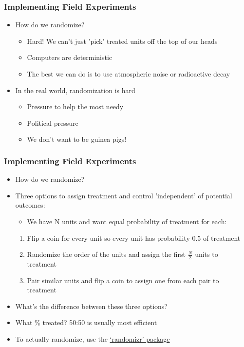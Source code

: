 \documentclass[xcolor=x11names,compress]{beamer}\usepackage[]{graphicx}\usepackage[]{color}
\renewcommand{\(}{\begin{columns}}
\renewcommand{\)}{\end{columns}}
\newcommand{\<}[1]{\begin{column}{#1}}
\renewcommand{\>}{\end{column}}
\begin{document}
\begin{frame}
\frametitle{Implementing Field Experiments}
\begin{itemize}
\item How do we randomize?
\begin{itemize}
\item Hard! We can't just 'pick' treated units off the top of our heads
\pause
\item Computers are deterministic
\pause
\item The best we can do is to use atmospheric noise or radioactive decay
\pause
\end{itemize}
\item In the real world, randomization is hard
\begin{itemize}
\item Pressure to help the most needy
\pause
\item Political pressure
\pause
\item We don't want to be guinea pigs!
\end{itemize}
\end{itemize}
\end{frame}


\begin{frame}
\frametitle{Implementing Field Experiments}
\begin{itemize}
\item How do we randomize?
\pause
\item Three options to assign treatment and control 'independent' of potential outcomes:
\pause
\begin{itemize}
\item We have N units and want equal probability of treatment for each:
\end{itemize}
\begin{enumerate}
\item Flip a coin for every unit so every unit has probability $0.5$ of treatment
\pause
\item Randomize the order of the units and assign the first $\frac{N}{2}$ units to treatment
\pause
\item Pair similar units and flip a coin to assign one from each pair to treatment
\pause
\end{enumerate}
\item What's the difference between these three options?
\pause
\item What \% treated? 50:50 is usually most efficient
\pause
\item To actually randomize, use the \href{https://cran.r-project.org/web/packages/randomizr/vignettes/randomizr_vignette.html}{`randomizr' package} 
\end{itemize}
\end{frame}
\end{document}
